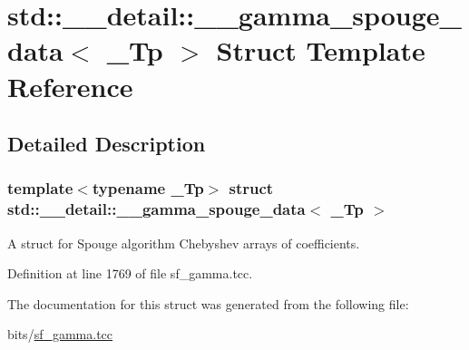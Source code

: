 \hypertarget{structstd_1_1____detail_1_1____gamma__spouge__data}{}\section{std\+:\+:\+\_\+\+\_\+detail\+:\+:\+\_\+\+\_\+gamma\+\_\+spouge\+\_\+data$<$ \+\_\+\+Tp $>$ Struct Template Reference}
\label{structstd_1_1____detail_1_1____gamma__spouge__data}


\subsection{Detailed Description}
\subsubsection*{template$<$typename \+\_\+\+Tp$>$\newline
struct std\+::\+\_\+\+\_\+detail\+::\+\_\+\+\_\+gamma\+\_\+spouge\+\_\+data$<$ \+\_\+\+Tp $>$}

A struct for Spouge algorithm Chebyshev arrays of coefficients. 

Definition at line 1769 of file sf\+\_\+gamma.\+tcc.



The documentation for this struct was generated from the following file\+:\begin{DoxyCompactItemize}
\item 
bits/\hyperlink{sf__gamma_8tcc}{sf\+\_\+gamma.\+tcc}\end{DoxyCompactItemize}
